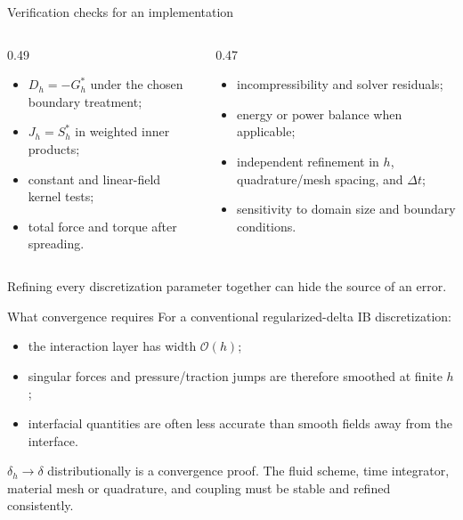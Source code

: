 \documentclass[aspectratio=169,11pt]{beamer}
\begin{document}
\begin{frame}{Verification checks for an implementation}
\begin{columns}[T,onlytextwidth]
\begin{column}{0.49\textwidth}
\begin{itemize}\itemsep4pt
  \item $D_h=-G_h^*$ under the chosen boundary treatment;
  \item $J_h=S_h^*$ in weighted inner products;
  \item constant and linear-field kernel tests;
  \item total force and torque after spreading.
\end{itemize}
\end{column}
\begin{column}{0.47\textwidth}
\begin{itemize}\itemsep4pt
  \item incompressibility and solver residuals;
  \item energy or power balance when applicable;
  \item independent refinement in $h$, quadrature/mesh spacing, and $\Delta t$;
  \item sensitivity to domain size and boundary conditions.
\end{itemize}
\end{column}
\end{columns}
\begin{punchbox}
Refining every discretization parameter together can hide the source of an error.
\end{punchbox}
\end{frame}

\begin{frame}{What convergence requires}
For a conventional regularized-delta IB discretization:
\begin{itemize}\itemsep5pt
  \item the interaction layer has width $\mathcal{O}(h)$;
  \item singular forces and pressure/traction jumps are therefore smoothed at finite $h$;
  \item interfacial quantities are often less accurate than smooth fields away from the interface.
\end{itemize}
\begin{punchbox}
$\delta_h\to\delta$ distributionally is  a convergence proof. The fluid scheme, time integrator, material mesh or quadrature, and coupling must be stable and refined consistently.
\end{punchbox}
\end{frame}
\end{document}
